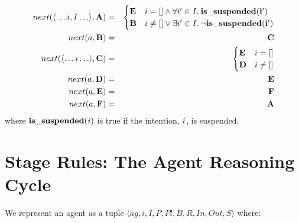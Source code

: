 \begin{eqnarray}
  \label{def:next}
next(\langle \ldots i, I \ldots \rangle, \textbf{A}) & = & \begin{cases} \textbf{E}  & i = [] \wedge \forall i' \in I.\: \bf is\_suspended(i') \\
  \textbf{B} & i \neq [] \vee \exists i' \in I. \: \neg \bf is\_suspended(i') \nonumber \\
  \end{cases}  \\
next(a, \textbf{B}) & = & \textbf{C}  \\
next(\langle \ldots i \ldots \rangle, \textbf{C}) & = &
\begin{cases}
  \textbf{E} & i = [] \nonumber \\
  \textbf{D}  & i \neq []\nonumber \\
  \end{cases}  \\
next(a, \textbf{D}) & = & \textbf{E}\nonumber \\
next(a, \textbf{E}) & = & \textbf{F}\nonumber \\
next(a, \textbf{F}) & = & \textbf{A} \nonumber
\end{eqnarray}
where $\bf is\_suspended(\mathit{i})$ is true if the intention, $\mathit{i}$, is suspended.

\section{Stage Rules: The Agent Reasoning Cycle}
\label{sec:stage_rules}

We represent an agent as a tuple $\langle \mathit{ag}, i, I, P, \mathit{Pl}, B, R,
\mathit{In}, \mathit{Out}, S \rangle$ where:

